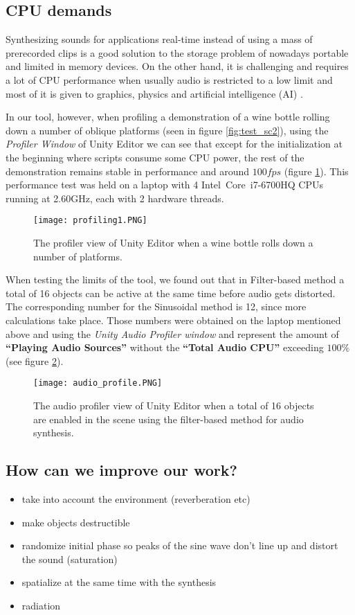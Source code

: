 \subsection{CPU demands}
Synthesizing sounds for applications real-time instead of using a mass of prerecorded clips is a good solution to the storage problem of nowadays portable and limited in memory devices. On the other hand, it is challenging and requires a lot of CPU performance when usually audio is restricted to a low limit and most of it is given to graphics, physics and artificial intelligence (AI) \cite{lloyd2011sound}. 

In our tool, however, when profiling a demonstration of a wine bottle rolling down a number of oblique platforms (seen in figure \ref{fig:test_sc2}), using the \textit{Profiler Window} of Unity Editor we can see that except for the initialization at the beginning where scripts consume some CPU power, the rest of the demonstration remains stable in performance and around $100 fps$ (figure \ref{fig:profile}). This performance test was held on a laptop with 4 Intel\textregistered\ Core\texttrademark\ i7-6700HQ CPUs running at 2.60GHz, each with 2 hardware threads.

\begin{figure}[H]
  \centering
    \texttt{[image: profiling1.PNG]}
      \caption{The profiler view of Unity Editor when a wine bottle rolls down a number of platforms.}
      \label{fig:profile}
\end{figure} 

When testing the limits of the tool, we found out that in Filter-based method a total of 16 objects can be active at the same time before audio gets distorted. The corresponding number for the Sinusoidal method is 12, since more calculations take place. Those numbers were obtained on the laptop mentioned above and using the \textit{Unity Audio Profiler window} and represent the amount of \textbf{``Playing Audio Sources''} without the \textbf{``Total Audio CPU''} exceeding $100\%$ (see figure \ref{fig:audio_profile}).

\begin{figure}[H]
  \centering
    \texttt{[image: audio\_profile.PNG]}
      \caption{The audio profiler view of Unity Editor when a total of 16 objects are enabled in the scene using the filter-based method for audio synthesis.}
      \label{fig:audio_profile}
\end{figure}

\subsection{How can we improve our work?}
\begin{itemize}
\item take into account the environment (reverberation etc)
\item make objects destructible
\item randomize initial phase so peaks of the sine wave don't line up and distort the sound (saturation)
\item spatialize at the same time with the synthesis
\item radiation
\end{itemize}

